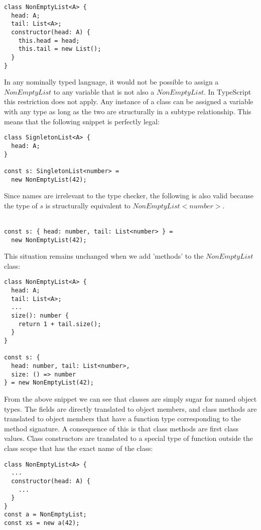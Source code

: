 \begin{lstlisting}
class NonEmptyList<A> {
  head: A;
  tail: List<A>;
  constructor(head: A) {
    this.head = head;
    this.tail = new List();
  }
}
\end{lstlisting}

In any nominally typed language, it would not be possible to assign a $NonEmptyList$ to any variable that is not also a $NonEmptyList$.
In TypeScript this restriction does not apply. 
Any instance of a class can be assigned a variable with any type as long as the two are structurally in a subtype relationship.
This means that the following snippet is perfectly legal:

\begin{lstlisting}
class SignletonList<A> {
  head: A;
}

const s: SingletonList<number> = 
  new NonEmptyList(42);
\end{lstlisting}

Since names are irrelevant to the type checker, the following is also valid because the type of 
$s$ is structurally equivalent to $NonEmptyList<number>$.
\\
\\
\begin{lstlisting}
const s: { head: number, tail: List<number> } =
  new NonEmptyList(42);
\end{lstlisting}

This situation remains unchanged when we add 'methods' to the $NonEmptyList$ class:

\begin{lstlisting}
class NonEmptyList<A> {
  head: A;
  tail: List<A>;
  ...
  size(): number {
    return 1 + tail.size();
  }
}

const s: { 
  head: number, tail: List<number>,
  size: () => number  
} = new NonEmptyList(42);
\end{lstlisting}

From the above snippet we can see that classes are simply sugar for named object types.
The fields are directly translated to object members, and class methods are translated
to object members that have a function type corresponding to the method signature.
A consequence of this is that class methods are first class values.
Class constructors are translated to a special type of function outside the class scope that has the exact name of the class:

\begin{lstlisting}
class NonEmptyList<A> {
  ...
  constructor(head: A) {
    ...
  }
}
const a = NonEmptyList;
const xs = new a(42);
\end{lstlisting}

